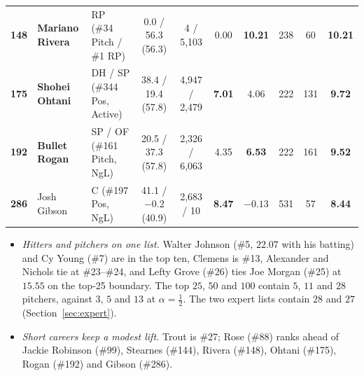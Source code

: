\documentclass[11pt,letterpaper]{article}
\theoremstyle{plain}
\theoremstyle{definition}
\theoremstyle{remark}
\begin{document}
\begin{table}[htbp]
{\begin{tabular}{@{}cllccccccc@{}}
\textbf{148} & \textbf{Mariano Rivera} & RP (\#34 Pitch / \#1 RP) & 0.0 / 56.3 (56.3) & 4 / 5,103 & 0.00 & \textbf{10.21} & 238 & 60 & \textbf{10.21} \\
\textbf{175} & \textbf{Shohei Ohtani} & DH / SP (\#344 Pos, Active) & 38.4 / 19.4 (57.8) & 4,947 / 2,479 & \textbf{7.01} & 4.06 & 222 & 131 & \textbf{9.72} \\
\textbf{192} & \textbf{Bullet Rogan} & SP / OF (\#161 Pitch, NgL) & 20.5 / 37.3 (57.8) & 2,326 / 6,063 & 4.35 & \textbf{6.53} & 222 & 161 & \textbf{9.52} \\
\textbf{286} & Josh Gibson & C (\#197 Pos, NgL) & 41.1 / $-0.2$ (40.9) & 2,683 / 10 & \textbf{8.47} & $-0.13$ & 531 & 57 & \textbf{8.44} \\
\bottomrule
\end{tabular}%
}
\end{table}


\begin{itemize}
    \item \emph{Hitters and pitchers on one list.} Walter Johnson (\#5, $22.07$ with his batting) and Cy Young (\#7) are in the top ten, Clemens is \#13, Alexander and Nichols tie at \#23--\#24, and Lefty Grove (\#26) ties Joe Morgan (\#25) at $15.55$ on the top-25 boundary. The top $25$, $50$ and $100$ contain $5$, $11$ and $28$ pitchers, against $3$, $5$ and $13$ at $\alpha = \tfrac12$. The two expert lists contain $28$ and $27$ (Section~\ref{sec:expert}).
    \item \emph{Short careers keep a modest lift.} Trout is \#27; Rose (\#88) ranks ahead of Jackie Robinson (\#99), Stearnes (\#144), Rivera (\#148), Ohtani (\#175), Rogan (\#192) and Gibson (\#286).
\end{itemize}
\end{document}
